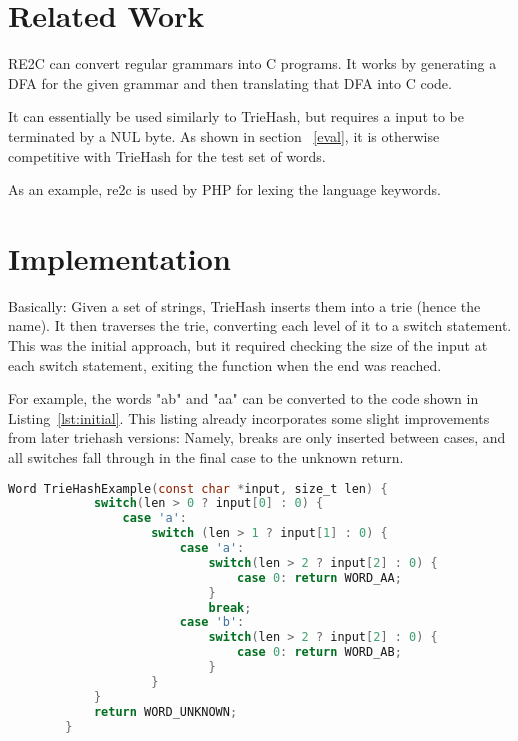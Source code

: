 \documentclass[parskip=half]{scrartcl}
\begin{document}
    \section{Related Work}
    RE2C\cite{bumbulis1993re2c} can convert regular grammars into C
    programs. It works by generating a DFA for the given grammar and
    then translating that DFA into C code.

    It can essentially be used similarly to TrieHash, but requires a input
    to be terminated by a NUL byte. As shown in section ~\ref{eval}, it is
    otherwise competitive with TrieHash for the test set of words.

    As an example, re2c is used by PHP for lexing the language keywords.
    
    
    \section{Implementation}
    Basically: Given a set of strings, TrieHash inserts them into a trie
    (hence the name). It then traverses the trie, converting each level
    of it to a switch statement. This was the initial approach, but it
    required checking the size of the input at each switch statement,
    exiting the function when the end was reached.

    For example, the words "ab" and "aa" can be converted to the code shown
    in Listing~\ref{lst:initial}. This listing already incorporates some slight
    improvements from later triehash versions: Namely, breaks are only inserted
    between cases, and all switches fall through in the final case to the
    unknown return.

    \begin{lstlisting}[language=C,gobble=8,label=lst:initial,caption=Code generated by initial triehash version,frame=tb]
        Word TrieHashExample(const char *input, size_t len) {
            switch(len > 0 ? input[0] : 0) {
                case 'a':
                    switch (len > 1 ? input[1] : 0) {
                        case 'a':
                            switch(len > 2 ? input[2] : 0) {
                                case 0: return WORD_AA;
                            }
                            break;
                        case 'b':
                            switch(len > 2 ? input[2] : 0) {
                                case 0: return WORD_AB;
                            }
                    }
            }
            return WORD_UNKNOWN;
        }
    \end{lstlisting}
\end{document}
